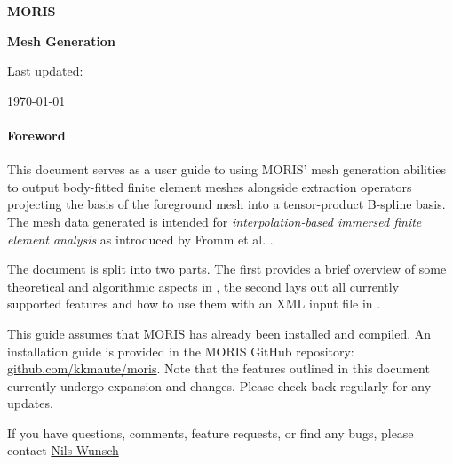 
\newpage
\thispagestyle{empty}

\vspace{3.0cm}

\bigskip
\centerline{ \Large{ \textbf{ MORIS }}} 
\vspace{0.3cm}
\centerline{ \Large{ \textbf{ Mesh Generation }}}


\vspace{1.0cm}

\begin{center}
	\centerline{Last updated:} 
    \today
\end{center}



\vspace{1.6cm}

\paragraph{Foreword}
This document serves as a user guide to using MORIS' mesh generation abilities to output body-fitted finite element meshes alongside extraction operators projecting the basis of the foreground mesh into a tensor-product B-spline basis. The mesh data generated is intended for \emph{interpolation-based immersed finite element analysis} as introduced by Fromm et al. \cite{Fromm2022}. 

The document is split into two parts. The first provides a brief overview of some theoretical and algorithmic aspects in , the second lays out all currently supported features and how to use them with an \textsc{XML} input file in . 

This guide assumes that MORIS has already been installed and compiled. An installation guide is provided in the MORIS GitHub repository:
\href{https://github.com/kkmaute/moris/tree/main/share/install}{github.com/kkmaute/moris}.
Note that the features outlined in this document currently undergo expansion and changes. Please check back regularly for any updates.

If you have questions, comments, feature requests, or find any bugs, please contact \href{mailto:nils.wunsch@colorado.com}{Nils Wunsch \Letter}


